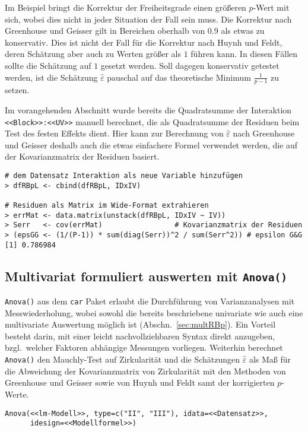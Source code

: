 Im Beispiel bringt die Korrektur der Freiheitsgrade einen größeren $p$-Wert mit sich, wobei dies nicht in jeder Situation der Fall sein muss. Die Korrektur nach Greenhouse und Geisser gilt in Bereichen oberhalb von $0.9$ als etwas zu konservativ. Dies ist nicht der Fall für die Korrektur nach Huynh und Feldt, deren Schätzung aber auch zu Werten größer als $1$ führen kann. In diesen Fällen sollte die Schätzung auf $1$ gesetzt werden. Soll dagegen konservativ getestet werden, ist die Schätzung $\hat{\varepsilon}$ pauschal auf das theoretische Minimum $\frac{1}{p-1}$ zu setzen.

Im vorangehenden Abschnitt wurde bereits die Quadratsumme der Interaktion \lstinline!<<Block>>:<<UV>>! manuell berechnet, die als Quadratsumme der Residuen beim Test des festen Effekts dient. Hier kann zur Berechnung von $\hat{\varepsilon}$ nach Greenhouse und Geisser deshalb auch die etwas einfachere Formel verwendet werden, die auf der Kovarianzmatrix der Residuen basiert.
\begin{lstlisting}
# dem Datensatz Interaktion als neue Variable hinzufügen
> dfRBpL <- cbind(dfRBpL, IDxIV)

# Residuen als Matrix im Wide-Format extrahieren
> errMat <- data.matrix(unstack(dfRBpL, IDxIV ~ IV))
> Serr   <- cov(errMat)                 # Kovarianzmatrix der Residuen
> (epsGG <- (1/(P-1)) * sum(diag(Serr))^2 / sum(Serr^2)) # epsilon G&G
[1] 0.786984
\end{lstlisting}

\subsection{Multivariat formuliert auswerten mit \texttt{Anova()}}
\label{sec:AnovaRBp}

\lstinline!Anova()! aus dem \lstinline!car! Paket erlaubt die Durchführung von Varianzanalysen mit Messwiederholung, wobei sowohl die bereits beschriebene univariate wie auch eine multivariate Auswertung möglich ist (Abschn.\ \ref{sec:multRBp}). Ein Vorteil besteht darin, mit einer leicht nachvollziehbaren Syntax direkt anzugeben, bzgl.\ welcher Faktoren abhängige Messungen vorliegen. Weiterhin berechnet \lstinline!Anova()! den Mauchly-Test auf Zirkularität und die Schätzungen $\hat{\varepsilon}$ als Maß für die Abweichung der Kovarianzmatrix von Zirkularität mit den Methoden von Greenhouse und Geisser sowie von Huynh und Feldt
 samt der korrigierten $p$-Werte.
\begin{lstlisting}
Anova(<<lm-Modell>>, type=c("II", "III"), idata=<<Datensatz>>,
      idesign=<<Modellformel>>)
\end{lstlisting}

